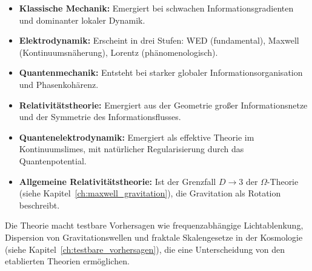 \begin{itemize}
    \item \textbf{Klassische Mechanik:} Emergiert bei schwachen Informationsgradienten und dominanter lokaler Dynamik.
    \item \textbf{Elektrodynamik:} Erscheint in drei Stufen: WED (fundamental), Maxwell (Kontinuumsnäherung), Lorentz (phänomenologisch).
    \item \textbf{Quantenmechanik:} Entsteht bei starker globaler Informationsorganisation und Phasenkohärenz.
    \item \textbf{Relativitätstheorie:} Emergiert aus der Geometrie großer Informationsnetze und der Symmetrie des Informationsflusses.
    \item \textbf{Quantenelektrodynamik:} Emergiert als effektive Theorie im Kontinuumslimes, mit natürlicher Regularisierung durch das Quantenpotential.
    \item \textbf{Allgemeine Relativitätstheorie:} Ist der Grenzfall \( D \to 3 \) der \( \Omega \)-Theorie (siehe Kapitel~\ref{ch:maxwell_gravitation}), die Gravitation als Rotation beschreibt.
\end{itemize}

Die Theorie macht testbare Vorhersagen wie frequenzabhängige Lichtablenkung, Dispersion von Gravitationswellen und fraktale Skalengesetze in der Kosmologie (siehe Kapitel~\ref{ch:testbare_vorhersagen}), die eine Unterscheidung von den etablierten Theorien ermöglichen.